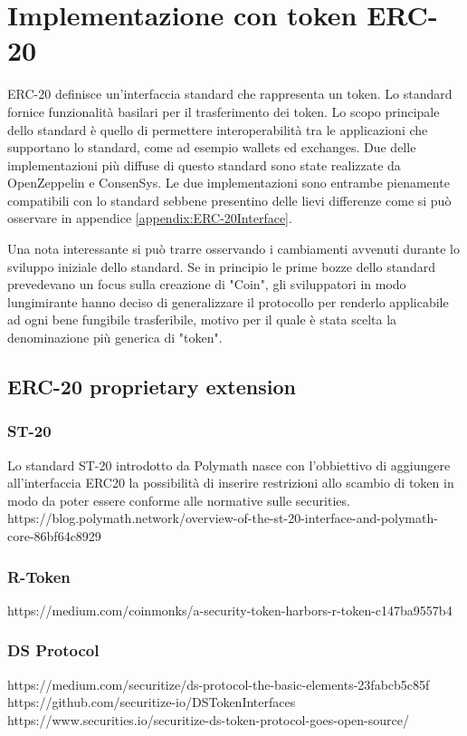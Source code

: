 \section{Implementazione con token ERC-20}
ERC-20 definisce un'interfaccia standard che rappresenta un token. Lo standard fornice funzionalità basilari per il trasferimento dei token. Lo scopo principale dello standard è quello di permettere interoperabilità tra le applicazioni che supportano lo standard, come ad esempio wallets ed exchanges. 
Due delle implementazioni più diffuse di questo standard sono state realizzate da OpenZeppelin e ConsenSys. Le due implementazioni sono entrambe pienamente compatibili con lo standard sebbene presentino delle lievi differenze come si può osservare in appendice \ref{appendix:ERC-20Interface}.

Una nota interessante si può trarre osservando i cambiamenti avvenuti durante lo sviluppo iniziale dello standard. Se in principio le prime bozze dello standard prevedevano un focus sulla creazione di "Coin", gli sviluppatori in modo lungimirante hanno deciso di generalizzare il protocollo per renderlo applicabile ad ogni bene fungibile trasferibile, motivo per il quale è stata scelta la denominazione più generica di "token"\cite{https://www.reddit.com/r/ethereum/comments/3n8fkn/lets_talk_about_the_coin_standard/}.


\subsection{ERC-20 proprietary extension}
\subsubsection{ST-20}
Lo standard ST-20 introdotto da Polymath nasce con l'obbiettivo di aggiungere all'interfaccia ERC20 la possibilità di inserire restrizioni allo scambio di token in modo da poter essere conforme alle normative sulle securities. 
https://blog.polymath.network/overview-of-the-st-20-interface-and-polymath-core-86bf64c8929
\subsubsection{R-Token}
https://medium.com/coinmonks/a-security-token-harbors-r-token-c147ba9557b4
\subsubsection{DS Protocol}
https://medium.com/securitize/ds-protocol-the-basic-elements-23fabcb5c85f
https://github.com/securitize-io/DSTokenInterfaces
https://www.securities.io/securitize-ds-token-protocol-goes-open-source/
